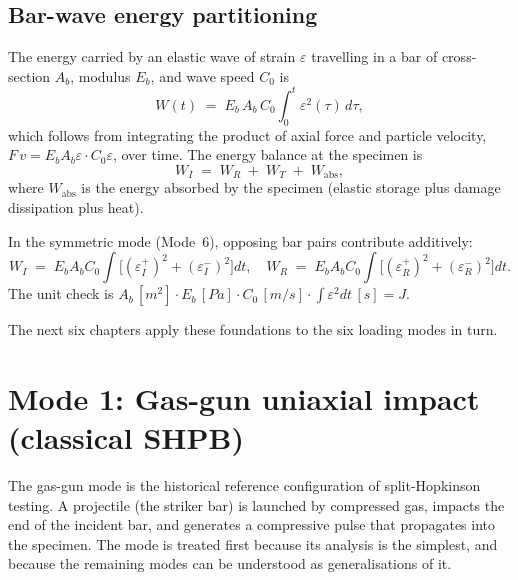 \documentclass[11pt,a4paper,openany]{book}
\theoremstyle{handbook}
\newcommand{\eps}{\varepsilon}
\newcommand{\Cz}{C_0}
\newcommand{\Ab}{A_b}
\begin{document}
\section{Bar-wave energy partitioning}\label{sec:energy}

The energy carried by an elastic wave of strain $\eps$ travelling in a bar
of cross-section $\Ab$, modulus $E_b$, and wave speed $\Cz$ is
\begin{equation}
  W(t) \;=\; E_b\,\Ab\,\Cz \int_{0}^{t}\!\eps^{2}(\tau)\,d\tau,
  \label{eq:bar-energy}
\end{equation}
which follows from integrating the product of axial force and particle
velocity, $F\,v = E_b\Ab\eps\cdot\Cz\eps$, over time. The energy balance at
the specimen is
\begin{equation}
  W_I \;=\; W_R \;+\; W_T \;+\; W_{\text{abs}},
  \label{eq:energy-balance}
\end{equation}
where $W_{\text{abs}}$ is the energy absorbed by the specimen (elastic
storage plus damage dissipation plus heat).

In the symmetric mode (Mode~6), opposing bar pairs contribute additively:
\begin{equation}
  W_I \;=\; E_b\Ab\Cz\!\int\!\bigl[(\eps_I^{+})^{2}+(\eps_I^{-})^{2}\bigr]\!dt,
  \quad
  W_R \;=\; E_b\Ab\Cz\!\int\!\bigl[(\eps_R^{+})^{2}+(\eps_R^{-})^{2}\bigr]\!dt.
  \label{eq:sym-energy}
\end{equation}
The unit check is
$\Ab\,[\si{m^{2}}]\cdot E_b\,[\si{Pa}]\cdot \Cz\,[\si{m/s}]\cdot\int\eps^{2}dt\,[\si{s}] = \si{J}$.

\bigskip
\noindent The next six chapters apply these foundations to the six loading
modes in turn.


\chapter{Mode 1: Gas-gun uniaxial impact (classical SHPB)}\label{ch:mode1}

The gas-gun mode is the historical reference configuration of split-Hopkinson
testing. A projectile (the striker bar) is launched by compressed gas, impacts
the end of the incident bar, and generates a compressive pulse that propagates
into the specimen. The mode is treated first because its analysis is the
simplest, and because the remaining modes can be understood as
generalisations of it.
\end{document}
